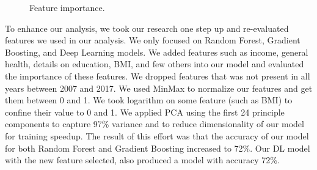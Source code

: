 \documentclass[letterpaper, 10 pt, conference]{ieeeconf}  %
\begin{document}
\begin{figure}[!htb]
        \caption{\label{fig:featureImportance} Feature importance.}
\end{figure}

To enhance our analysis, we took our research one step up and re-evaluated features we used in our analysis.
We only focused on Random Forest, Gradient Boosting, and Deep Learning models. 
We added features such as income, general health, details on education, BMI, and few others into 
our model and evaluated the importance of these features. We dropped features that was not present in all years between 2007 and 2017.
We used MinMax to normalize our features and get them between 0 and 1. 
We took logarithm on some feature (such as BMI) to confine their value to 0 and 1.
We applied PCA using the first 24 principle components to capture 97\% variance and to reduce dimensionality of our model for training speedup.
The result of this effort was that the accuracy of our model for both Random Forest and Gradient Boosting increased to 72\%.
Our DL model with the new feature selected, also produced a model with accuracy 72\%. 
\end{document}
